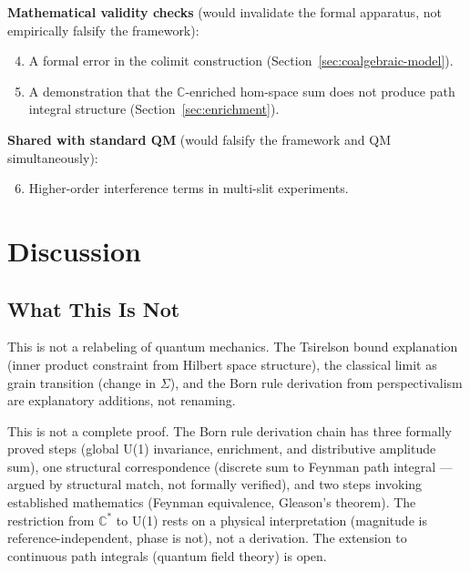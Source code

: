 \documentclass[12pt,a4paper]{article}
\begin{document}
\textbf{Mathematical validity checks} (would invalidate the formal apparatus, not empirically falsify the framework):

\begin{enumerate}
  \setcounter{enumi}{3}
  \item A formal error in the colimit construction (Section~\ref{sec:coalgebraic-model}).
  \item A demonstration that the $\mathbb{C}$-enriched hom-space sum does not produce path integral structure (Section~\ref{sec:enrichment}).
\end{enumerate}

\textbf{Shared with standard QM} (would falsify the framework and QM simultaneously):

\begin{enumerate}
  \setcounter{enumi}{5}
  \item Higher-order interference terms in multi-slit experiments.
\end{enumerate}

\section{Discussion}
\label{sec:discussion}

\subsection{What This Is Not}
\label{sec:what-this-is-not}

This is not a relabeling of quantum mechanics. The Tsirelson bound explanation (inner product constraint from Hilbert space structure), the classical limit as grain transition (change in $\Sigma$), and the Born rule derivation from perspectivalism are explanatory additions, not renaming.

This is not a complete proof. The Born rule derivation chain has three formally proved steps (global U(1) invariance, enrichment, and distributive amplitude sum), one structural correspondence (discrete sum to Feynman path integral --- argued by structural match, not formally verified), and two steps invoking established mathematics (Feynman equivalence, Gleason's theorem). The restriction from $\mathbb{C}^*$ to U(1) rests on a physical interpretation (magnitude is reference-independent, phase is not), not a derivation. The extension to continuous path integrals (quantum field theory) is open.
\end{document}
